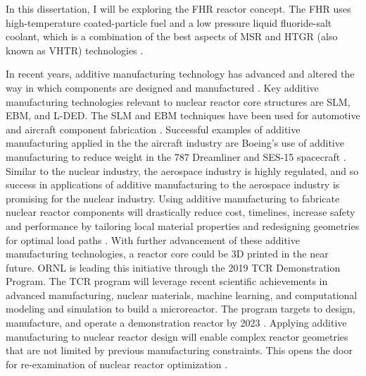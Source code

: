 In this dissertation, I will be exploring the \gls{FHR} reactor concept. 
The \gls{FHR} uses high-temperature coated-particle fuel and a low pressure 
liquid fluoride-salt coolant, which is a combination of the best aspects of 
\gls{MSR} and \gls{HTGR} (also known as \gls{VHTR}) technologies
\cite{forsberg_fluoride-salt-cooled_2012,facilitators_fluoride-salt-cooled_2013}.

In recent years, additive manufacturing technology has advanced and  
altered the way in which components are designed and manufactured 
\cite{simpson_considerations_2019}. 
Key additive manufacturing technologies relevant to nuclear reactor core 
structures are \gls{SLM}, \gls{EBM}, and \gls{L-DED}. 
The \gls{SLM} and \gls{EBM} techniques have been used for automotive and aircraft component 
fabrication \cite{murr_frontiers_2016}.  
Successful examples of additive manufacturing applied in the the aircraft industry 
are Boeing’s use of additive manufacturing to reduce weight in the 787 Dreamliner
\cite{noauthor_printed_2017} and SES-15 spacecraft \cite{noauthor_boeing_nodate}. 
Similar to the nuclear industry, the aerospace industry is highly regulated, and 
so success in applications of additive manufacturing to the aerospace industry 
is promising for the nuclear industry.  
Using additive manufacturing to fabricate nuclear reactor components will 
drastically reduce cost, timelines, increase safety and performance by 
tailoring local material properties and redesigning geometries for optimal load paths 
\cite{simpson_considerations_2019}. 
With further advancement of these additive manufacturing technologies, a reactor 
core could be 3D printed in the near future. 
\gls{ORNL} is leading this initiative through the 2019 \gls{TCR} Demonstration 
Program. 
The \gls{TCR} program will leverage recent scientific achievements in advanced 
manufacturing, nuclear materials, machine learning, and computational modeling 
and simulation to build a microreactor. 
The program targets to design, manufacture, and operate a demonstration reactor 
by 2023 \cite{terrani_transformational_2019}. 
Applying additive manufacturing to nuclear reactor design will enable complex 
reactor geometries that are not limited by previous manufacturing constraints. 
This opens the door for re-examination of nuclear reactor optimization 
\cite{sobes_artificial_2020}. 



